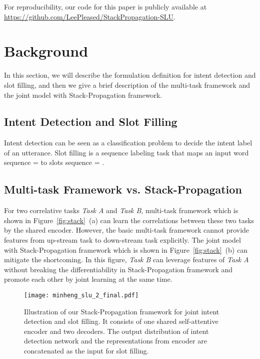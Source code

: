 \documentclass[11pt,a4paper]{article}
\begin{document}
For reproducibility, our code for this paper is publicly available at
\url{https://github.com/LeePleased/StackPropagation-SLU}.


\section{Background}
In this section, we will describe the formulation definition for intent detection
and slot filling, and then we give a brief
description of the multi-task framework and the joint model with Stack-Propagation framework.

\subsection{Intent Detection and Slot Filling}
Intent detection can be seen as a classification problem to decide the intent label  
of an utterance. 
Slot filling is a sequence labeling task that maps an input word sequence
 =  to slots sequence  = . 



\subsection{Multi-task Framework vs. Stack-Propagation}
For two correlative tasks \textit{Task A} and \textit{Task B}, multi-task framework which is shown in Figure~\ref{fig:stack}~(a) can learn the correlations between these two tasks by the shared encoder. 
However, the basic multi-task framework cannot provide features from up-stream task to down-stream task explicitly.
The joint model with
Stack-Propagation framework which is shown in Figure~\ref{fig:stack}~(b) can mitigate the shortcoming.
In this figure, \textit{Task B} can leverage features of \textit{Task A} without breaking the differentiability in
Stack-Propagation framework and promote each other by joint learning at the same time.
\begin{figure} [t]
	\centering
	\texttt{[image: minheng\_slu\_2\_final.pdf]}
	\caption{Illustration of our Stack-Propagation framework for joint intent detection and slot filling. It consists of one shared self-attentive encoder and two decoders. The output distribution of intent detection network and the representations from encoder are concatenated as the input for slot filling.}
	\label{fig:framework}
\end{figure}
\end{document}
